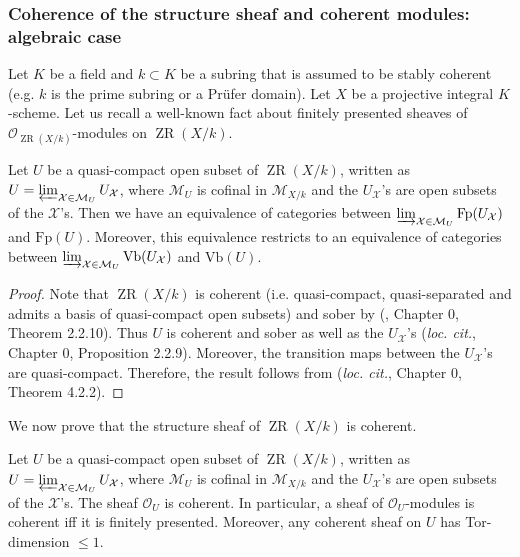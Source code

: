\documentclass [11pt,reqno]{amsart}
\newcommand{\1}{\mathmybb{1}}
\def\cM{{\mathcal{M}}}
\def\cO{{\mathcal{O}}}
\def\cX{{\mathcal{X}}}
\def\ZR{\operatorname{ZR}}
\begin{document}
\subsubsection{Coherence of the structure sheaf and coherent modules: algebraic case}
\label{subsub:coherence_structure_sheaf_field_algebraic}

Let $K$ be a field and $k\subset K$ be a subring that is assumed to be stably coherent (e.g. $k$ is the prime subring or a Prüfer domain). Let $X$ be a projective integral $K$-scheme. Let us recall a well-known fact about finitely presented sheaves of $\cO_{\ZR(X/k)}$-modules on $\ZR(X/k)$.

\begin{proposition}
\label{prop:fp_sheaves_ZR_algebraic}
Let $U$ be a quasi-compact open subset of $\ZR(X/k)$, written as $U=\varprojlim_{\cX\in \cM_{U}}U_{\cX}$, where $\cM_{U}$ is cofinal in $\cM_{X/k}$ and the $U_{\cX}$'s are open subsets of the $\cX$'s. Then we have an equivalence of categories between $\varinjlim_{\cX\in\cM_{U}}\mathrm{Fp}(U_{\cX})$ and $\mathrm{Fp}(U)$. Moreover, this equivalence restricts to an equivalence of categories between $\varinjlim_{\cX\in\cM_{U}}\mathrm{Vb}(U_{\cX})$ and $\mathrm{Vb}(U)$.
\end{proposition}

\begin{proof}
Note that $\ZR(X/k)$ is coherent (i.e. quasi-compact, quasi-separated and admits a basis of quasi-compact open subsets) and sober by (\cite{Fujiwara-Kato}, Chapter 0, Theorem 2.2.10). Thus $U$ is coherent and sober as well as the $U_{\cX}$'s (\emph{loc. cit.}, Chapter 0, Proposition 2.2.9). Moreover, the transition maps between the $U_{\cX}$'s are quasi-compact. Therefore, the result follows from (\emph{loc. cit.}, Chapter 0, Theorem 4.2.2).
\end{proof}

We now prove that the structure sheaf of $\ZR(X/k)$ is coherent. 

\begin{proposition}
\label{prop:coherence_algeabraic_ZR_sheaf}
Let $U$ be a quasi-compact open subset of $\ZR(X/k)$, written as $U=\varprojlim_{\cX\in \cM_{U}}U_{\cX}$, where $\cM_{U}$ is cofinal in $\cM_{X/k}$ and the $U_{\cX}$'s are open subsets of the $\cX$'s. The sheaf $\cO_{U}$ is coherent. In particular, a sheaf of $\cO_{U}$-modules is coherent iff it is finitely presented. Moreover, any coherent sheaf on $U$ has Tor-dimension $\leq 1$.
\end{proposition}
\end{document}
